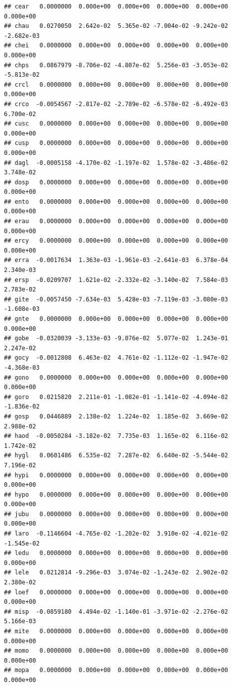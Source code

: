 \documentclass[
]{article}
\begin{document}
\begin{verbatim}
## cear   0.0000000  0.000e+00  0.000e+00  0.000e+00  0.000e+00  0.000e+00
## chau   0.0270050  2.642e-02  5.365e-02 -7.004e-02 -9.242e-02 -2.682e-03
## chei   0.0000000  0.000e+00  0.000e+00  0.000e+00  0.000e+00  0.000e+00
## chps   0.0867979 -8.706e-02 -4.807e-02  5.256e-03 -3.053e-02 -5.813e-02
## crcl   0.0000000  0.000e+00  0.000e+00  0.000e+00  0.000e+00  0.000e+00
## crco  -0.0054567 -2.817e-02 -2.789e-02 -6.578e-02 -6.492e-03  6.700e-02
## cusc   0.0000000  0.000e+00  0.000e+00  0.000e+00  0.000e+00  0.000e+00
## cusp   0.0000000  0.000e+00  0.000e+00  0.000e+00  0.000e+00  0.000e+00
## dagl  -0.0005158 -4.170e-02 -1.197e-02  1.578e-02 -3.486e-02  3.748e-02
## dosp   0.0000000  0.000e+00  0.000e+00  0.000e+00  0.000e+00  0.000e+00
## ento   0.0000000  0.000e+00  0.000e+00  0.000e+00  0.000e+00  0.000e+00
## erau   0.0000000  0.000e+00  0.000e+00  0.000e+00  0.000e+00  0.000e+00
## ercy   0.0000000  0.000e+00  0.000e+00  0.000e+00  0.000e+00  0.000e+00
## erra  -0.0017634  1.363e-03 -1.961e-03 -2.641e-03  6.378e-04  2.340e-03
## ersp  -0.0209707  1.621e-02 -2.332e-02 -3.140e-02  7.584e-03  2.783e-02
## gite  -0.0057450 -7.634e-03  5.428e-03 -7.119e-03 -3.080e-03 -1.608e-03
## gnte   0.0000000  0.000e+00  0.000e+00  0.000e+00  0.000e+00  0.000e+00
## gobe  -0.0320039 -3.133e-03 -9.076e-02  5.077e-02  1.243e-01  2.247e-02
## gocy  -0.0012808  6.463e-02  4.761e-02 -1.112e-02 -1.947e-02 -4.368e-03
## gono   0.0000000  0.000e+00  0.000e+00  0.000e+00  0.000e+00  0.000e+00
## goro   0.0215820  2.211e-01 -1.082e-01 -1.141e-02 -4.094e-02 -1.836e-02
## gosp   0.0446889  2.138e-02  1.224e-02  1.185e-02  3.669e-02  2.988e-02
## haod  -0.0050284 -3.182e-02  7.735e-03  1.165e-02  6.116e-02  1.742e-02
## hygl   0.0601486  6.535e-02  7.287e-02  6.640e-02 -5.544e-02  7.196e-02
## hypi   0.0000000  0.000e+00  0.000e+00  0.000e+00  0.000e+00  0.000e+00
## hypo   0.0000000  0.000e+00  0.000e+00  0.000e+00  0.000e+00  0.000e+00
## jubu   0.0000000  0.000e+00  0.000e+00  0.000e+00  0.000e+00  0.000e+00
## laro  -0.1146604 -4.765e-02 -1.202e-02  3.910e-02 -4.021e-02 -1.545e-02
## ledu   0.0000000  0.000e+00  0.000e+00  0.000e+00  0.000e+00  0.000e+00
## lele   0.0212814 -9.296e-03  3.074e-02 -1.243e-02  2.902e-02  2.380e-02
## loef   0.0000000  0.000e+00  0.000e+00  0.000e+00  0.000e+00  0.000e+00
## misp  -0.0859180  4.494e-02 -1.140e-01 -3.971e-02 -2.276e-02  5.166e-03
## mite   0.0000000  0.000e+00  0.000e+00  0.000e+00  0.000e+00  0.000e+00
## momo   0.0000000  0.000e+00  0.000e+00  0.000e+00  0.000e+00  0.000e+00
## mopa   0.0000000  0.000e+00  0.000e+00  0.000e+00  0.000e+00  0.000e+00

\end{verbatim}
\end{document}
